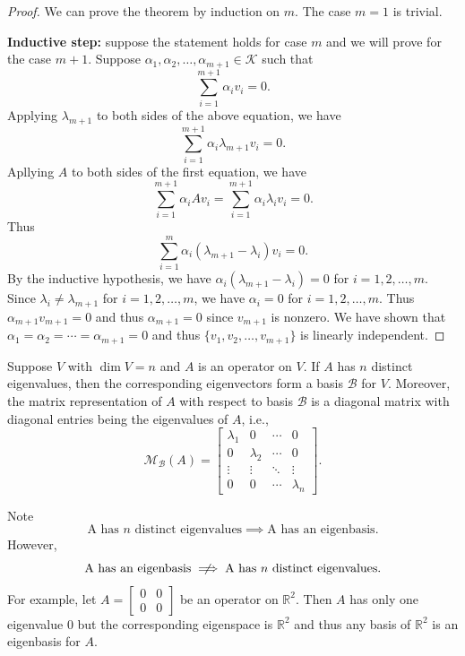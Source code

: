 \documentclass{ctexart}
\newcommand{\R}{\mathbb{R}}
\begin{document}
    \begin{proof}
        We can prove the theorem by induction on $m$. The case $m=1$ is trivial. 

        \textbf{Inductive step:} suppose the statement holds for case $m$ and we will prove for the case $m+1$. Suppose $\alpha_1, \alpha_2, \ldots, \alpha_{m+1} \in \mathcal{K}$ such that
        $$ \sum_{i=1}^{m+1} \alpha_i v_i = 0. $$
        Applying $\lambda_{m+1}$ to both sides of the above equation, we have
        $$ \sum_{i=1}^{m+1} \alpha_i \lambda_{m+1} v_i = 0. $$
        Apllying $A$ to both sides of the first equation, we have
        $$ \sum_{i=1}^{m+1} \alpha_i A v_i = \sum_{i=1}^{m+1} \alpha_i \lambda_i v_i = 0. $$
        Thus $$\sum_{i=1}^{m} \alpha_i (\lambda_{m+1} - \lambda_i) v_i = 0. $$
        By the inductive hypothesis, we have $\alpha_i (\lambda_{m+1} - \lambda_i) = 0$ for $i=1,2,\ldots,m$. Since $\lambda_i \neq \lambda_{m+1}$ for $i=1,2,\ldots,m$, we have $\alpha_i = 0$ for $i=1,2,\ldots,m$. Thus $\alpha_{m+1} v_{m+1} = 0$ and thus $\alpha_{m+1} = 0$ since $v_{m+1}$ is nonzero. We have shown that $\alpha_1 = \alpha_2 = \cdots = \alpha_{m+1} = 0$ and thus $\{v_1, v_2, \ldots, v_{m+1}\}$ is linearly independent.
    \end{proof}
    \begin{mypro}
        Suppose $V$ with $\dim V=n$ and $A$ is an operator on $V$. If $A$ has $n$ distinct eigenvalues, then the corresponding eigenvectors form a basis $\mathcal B$ for $V$. Moreover, the matrix representation of $A$ with respect to basis $\mathcal B$ is a diagonal matrix with diagonal entries being the eigenvalues of $A$, i.e.,
        $$ \mathcal M_{\mathcal B}(A) = \begin{bmatrix}
            \lambda_1 & 0 & \cdots & 0 \\
            0 & \lambda_2 & \cdots & 0 \\
            \vdots & \vdots & \ddots & \vdots \\
            0 & 0 & \cdots & \lambda_n
        \end{bmatrix}. $$
    \end{mypro}
    \begin{myrmk}
        Note
        $$ \text{A has } n \text{ distinct eigenvalues} \implies \text{A has an eigenbasis}.$$
        However,
        $$ \text{A has an eigenbasis} \centernot\implies \text{A has } n \text{ distinct eigenvalues}. $$
        For example, let $A = \begin{bmatrix}
            0 & 0 \\
            0 & 0
        \end{bmatrix}$ be an operator on $\R^2$. Then $A$ has only one eigenvalue $0$ but the corresponding eigenspace is $\R^2$ and thus any basis of $\R^2$ is an eigenbasis for $A$.
    \end{myrmk}
\end{document}
